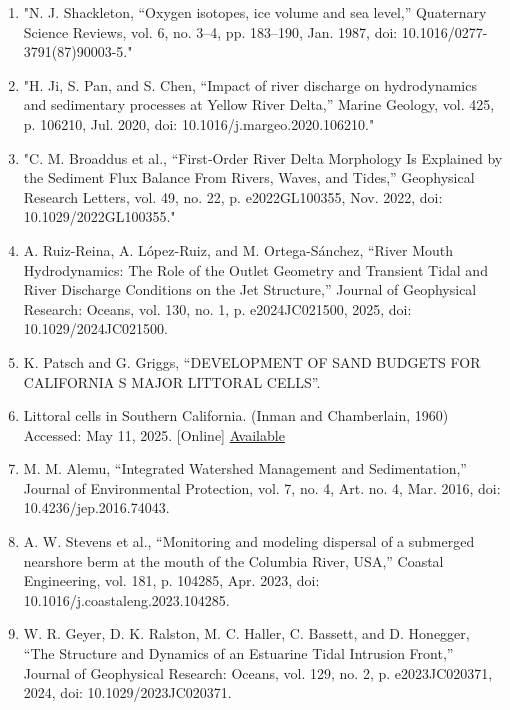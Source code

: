 \documentclass{article}
\begin{document}
\begin{enumerate}
    \item {"N. J. Shackleton, “Oxygen isotopes, ice volume and sea level,” Quaternary Science Reviews, vol. 6, no. 3–4, pp. 183–190, Jan. 1987, doi: 10.1016/0277-3791(87)90003-5."}

    \item {"H. Ji, S. Pan, and S. Chen, “Impact of river discharge on hydrodynamics and sedimentary processes at Yellow River Delta,” Marine Geology, vol. 425, p. 106210, Jul. 2020, doi: 10.1016/j.margeo.2020.106210."}

    \item{"C. M. Broaddus et al., “First‐Order River Delta Morphology Is Explained by the Sediment Flux Balance From Rivers, Waves, and Tides,” Geophysical Research Letters, vol. 49, no. 22, p. e2022GL100355, Nov. 2022, doi: 10.1029/2022GL100355."}

    \item{A. Ruiz-Reina, A. López-Ruiz, and M. Ortega-Sánchez, “River Mouth Hydrodynamics: The Role of the Outlet Geometry and Transient Tidal and River Discharge Conditions on the Jet Structure,” Journal of Geophysical Research: Oceans, vol. 130, no. 1, p. e2024JC021500, 2025, doi: 10.1029/2024JC021500.}

    \item{K. Patsch and G. Griggs, “DEVELOPMENT OF SAND BUDGETS FOR CALIFORNIA S MAJOR LITTORAL CELLS”.}

    \item{Littoral cells in Southern California. (Inman and Chamberlain, 1960) Accessed: May 11, 2025. [Online] \href{https://www.researchgate.net/figure/Littoral-cells-in-Southern-California-Inman-and-Chamberlain-1960-Thurman-and_fig4_240635473}{Available}}

    \item{M. M. Alemu, “Integrated Watershed Management and Sedimentation,” Journal of Environmental Protection, vol. 7, no. 4, Art. no. 4, Mar. 2016, doi: 10.4236/jep.2016.74043.}

    \item{A. W. Stevens et al., “Monitoring and modeling dispersal of a submerged nearshore berm at the mouth of the Columbia River, USA,” Coastal Engineering, vol. 181, p. 104285, Apr. 2023, doi: 10.1016/j.coastaleng.2023.104285.}

    \item{W. R. Geyer, D. K. Ralston, M. C. Haller, C. Bassett, and D. Honegger, “The Structure and Dynamics of an Estuarine Tidal Intrusion Front,” Journal of Geophysical Research: Oceans, vol. 129, no. 2, p. e2023JC020371, 2024, doi: 10.1029/2023JC020371.}


\end{enumerate}
\end{document}
